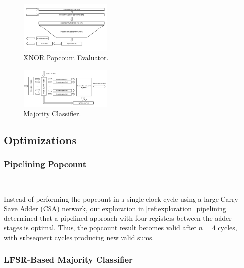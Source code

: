 \documentclass[conference]{IEEEtran}
\begin{document}
\begin{figure}[h]
    \centering
    \includegraphics[width=0.4\textwidth]{Xnor_popcount.pdf}
    \caption{XNOR Popcount Evaluator.}
    \label{fig:xnor_popcount}
\end{figure}

\begin{figure}[h]
    \centering
    \includegraphics[width=0.4\textwidth]{majority_classifier.pdf}
    \caption{Majority Classifier.}
    \label{fig:majority_classifier}
\end{figure}



\subsection{Optimizations}
\subsubsection{Pipelining Popcount}
\hfill\\
\label{ref:pipeline_popcount}

Instead of performing the popcount in a single clock cycle using a large Carry-Save Adder (CSA) network, our exploration in \autoref{ref:exploration_pipelining} determined that a pipelined approach with four registers between the adder stages is optimal. Thus, the popcount result becomes valid after $n=4$ cycles, with subsequent cycles producing new valid sums.

\subsubsection{LFSR-Based Majority Classifier}
\hfill\\
\label{ref:lfsr_opt}
\end{document}
